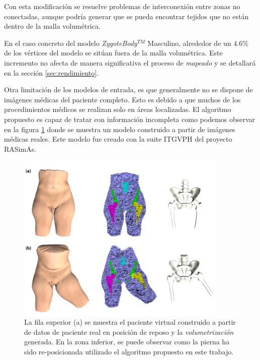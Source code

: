 %


Con esta modificación se resuelve problemas de interconexión entre zonas no conectadas, aunque podría generar que se pueda encontrar tejidos que no están dentro de la malla volumétrica. %

En el caso concreto del modelo \emph{ZygoteBody}$^{TM}$ Masculino, alrededor de un 4.6\% de los vértices del modelo se sitúan fuera de la malla volumétrica. 
Este incremento no afecta de manera significativa el proceso de \emph{mapeado} y se detallará en la sección  \ref{sec:rendimiento}.

Otra limitación de los modelos de entrada, es que generalmente no se dispone de imágenes médicas del paciente completo. Esto es debido a que muchos de los procedimientos médicos se realizan solo en áreas localizadas.
El algoritmo propuesto es capaz de tratar con información incompleta como podemos observar en la figura \ref{fig:patient} donde se muestra un modelo construido a partir de imágenes médicas reales. Este modelo fue creado con la suite \ac{ITGVPH} del proyecto \ac{RASimAs}.

\begin{figure}[h]
   \centering
    \includegraphics[width=0.9\textwidth]{IMG/patient.png}
    \caption{La fila superior (a) se muestra el paciente virtual construido a partir de datos de paciente real en posición de reposo y la \emph{volumetrización} generada. En la zona inferior, se puede observar como la pierna ha sido re-posicionada utilizado el algoritmo propuesto en este trabajo.
    }
   \label{fig:patient}
\end{figure}


